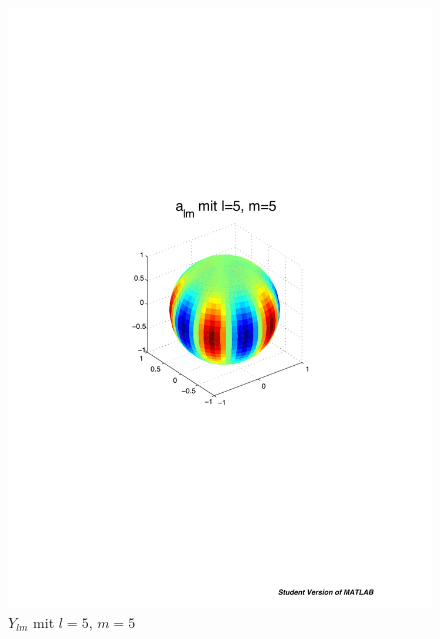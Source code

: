 \begin{refsection}
\begin{figure}
\begin{minipage}[hbt]{0.4\textwidth}
\includegraphics[width=1\textwidth]{kugel/ylm/a_5_5.pdf}
\caption{$Y_{lm}$ mit $l=5$, $m=5$}
\label{skript:ylm l=5 m=5}
\end{minipage}
\hfill
\begin{minipage}[hbt]{0.4\textwidth}
\centering

\end{minipage}
\end{figure}
\end{refsection}
